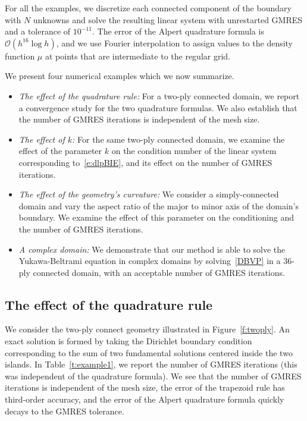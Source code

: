 For all the examples, we discretize each connected component of the
boundary with $N$ unknowns and solve the resulting linear system with
unrestarted GMRES and a tolerance of $10^{-11}$.  The error of the
Alpert quadrature formula is $\mathcal{O}(h^{16}\log h)$, and we use
Fourier interpolation to assign values to the density function $\mu$ at
points that are intermediate to the regular grid.

We present four numerical examples which we now summarize.
\begin{itemize}
  \item{\em{The effect of the quadrature rule}:} For a two-ply connected
  domain, we report a convergence study for the two quadrature formulas.
  We also establish that the number of GMRES iterations is independent
  of the mesh size.

  \item{\em{The effect of $k$}:} For the same two-ply connected domain,
  we examine the effect of the parameter $k$ on the condition number of
  the linear system corresponding to~\eqref{e:dlpBIE}, and its effect on
  the number of GMRES iterations.

  \item{\em{The effect of the geometry's curvature}:} We consider a
  simply-connected domain and vary the aspect ratio of the major to
  minor axis of the domain's boundary.  We examine the effect of this
  parameter on the conditioning and the number of GMRES iterations.

  \item{\em{A complex domain}:} We demonstrate that our method is able
  to solve the Yukawa-Beltrami equation in complex domains by
  solving~\eqref{DBVP} in a 36-ply connected domain, with an acceptable
  number of GMRES iterations.
\end{itemize}


\subsection{The effect of the quadrature rule}
We consider the two-ply connect geometry illustrated in
Figure~\ref{f:twoply}.  An exact solution is formed by taking the
Dirichlet boundary condition corresponding to the sum of two fundamental
solutions centered inside the two islands.  In Table~\ref{t:example1},
we report the number of GMRES iterations (this was independent of the
quadrature formula).  We see that the number of GMRES iterations is
independent of the mesh size, the error of the trapezoid rule has
third-order accuracy, and the error of the Alpert quadrature formula
quickly decays to the GMRES tolerance.

